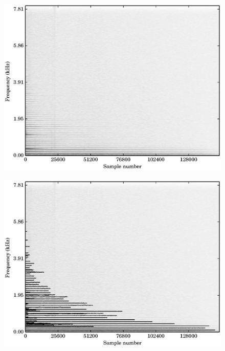 \begin{figure}[!t]
    \centering
    \includegraphics[width=\figwidthscale\textwidth]{plots/partial_estimation_acgtr_xylo_specgram.eps}
    \CaptionWithTitle{%
    }{\label{plot:acgtra3xylofs4specgram}}
\end{figure}

\begin{figure}[!t]
    \centering
    \includegraphics[width=\figwidthscale\textwidth]{plots/partial_estimation_acgtr_xylo_specgram_partials.eps}
    \CaptionWithTitle{%
    }{\label{plot:acgtra3xylofs4partials}}
\end{figure}

